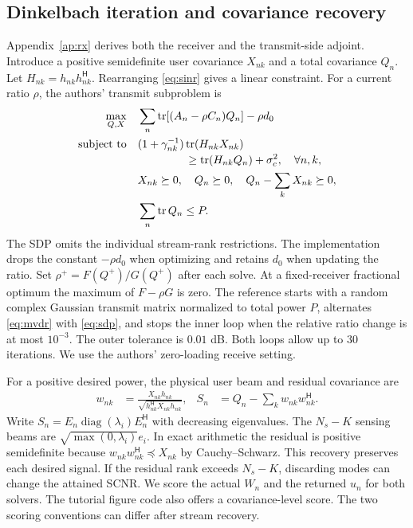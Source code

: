 \documentclass[journal]{IEEEtran}
\DeclareMathOperator{\tr}{tr}
\DeclareMathOperator{\diag}{diag}
\newcommand{\Hh}{^{\mathsf H}}
\begin{document}
\subsection{Dinkelbach iteration and covariance recovery}
Appendix~\ref{ap:rx} derives both the receiver and the transmit-side adjoint. Introduce a positive semidefinite user covariance $X_{nk}$ and a total covariance $Q_n$. Let $H_{nk}=h_{nk}h_{nk}\Hh$. Rearranging \eqref{eq:sinr} gives a linear constraint. For a current ratio $\rho$, the authors' transmit subproblem is~\cite{liu2026clutter,liuCode,dinkelbach}
\begin{subequations}\label{eq:sdp}
\begin{align}
 \max_{Q,X}\quad &\sum_n\tr[(A_n-\rho C_n)Q_n]-\rho d_0\\
 \text{subject to}\quad &
 (1+\gamma_{nk}^{-1})\tr(H_{nk}X_{nk}) \notag\\[-2pt]
 &\hspace{15mm}\ge\tr(H_{nk}Q_n)+\sigma_c^2,\quad \forall n,k,\\
 &X_{nk}\succeq0,\quad Q_n\succeq0,\quad
 Q_n-\sum_kX_{nk}\succeq0,\\
 &\sum_n\tr Q_n\le P .
\end{align}
\end{subequations}
The SDP omits the individual stream-rank restrictions. The implementation drops the constant $-\rho d_0$ when optimizing and retains $d_0$ when updating the ratio. Set $\rho^+=F(Q^+)/G(Q^+)$ after each solve. At a fixed-receiver fractional optimum the maximum of $F-\rho G$ is zero. The reference starts with a random complex Gaussian transmit matrix normalized to total power $P$, alternates \eqref{eq:mvdr} with \eqref{eq:sdp}, and stops the inner loop when the relative ratio change is at most $10^{-3}$. The outer tolerance is $0.01$ dB. Both loops allow up to 30 iterations. We use the authors' zero-loading receive setting.

For a positive desired power, the physical user beam and residual covariance are
\begin{align}
 w_{nk}&=\frac{X_{nk}h_{nk}}{\sqrt{h_{nk}\Hh X_{nk}h_{nk}}},&
 S_n&=Q_n-\sum_kw_{nk}w_{nk}\Hh . \label{eq:recover}
\end{align}
Write $S_n=E_n\diag(\lambda_i)E_n\Hh$ with decreasing eigenvalues. The $N_s-K$ sensing beams are $\sqrt{\max(0,\lambda_i)}e_i$. In exact arithmetic the residual is positive semidefinite because $w_{nk}w_{nk}\Hh\preceq X_{nk}$ by Cauchy--Schwarz. This recovery preserves each desired signal. If the residual rank exceeds $N_s-K$, discarding modes can change the attained SCNR. We score the actual $W_n$ and the returned $u_n$ for both solvers. The tutorial figure code also offers a covariance-level score. The two scoring conventions can differ after stream recovery.
\end{document}

